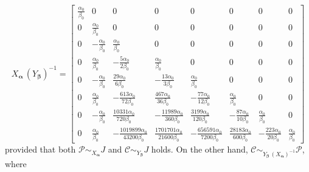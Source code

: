 \begin{displaymath}
{X_{\boldsymbol{\alpha}}\,\left(Y_{\boldsymbol{\beta}}\right)^{-1}} = \left[\begin{matrix}\frac{\alpha_{0}}{\beta_{0}} & 0 & 0 & 0 & 0 & 0 & 0 & 0\\0 & \frac{\alpha_{0}}{\beta_{0}} & 0 & 0 & 0 & 0 & 0 & 0\\0 & - \frac{\alpha_{0}}{\beta_{0}} & \frac{\alpha_{0}}{\beta_{0}} & 0 & 0 & 0 & 0 & 0\\0 & \frac{\alpha_{0}}{\beta_{0}} & - \frac{5 \alpha_{0}}{2 \beta_{0}} & \frac{\alpha_{0}}{\beta_{0}} & 0 & 0 & 0 & 0\\0 & - \frac{\alpha_{0}}{\beta_{0}} & \frac{29 \alpha_{0}}{6 \beta_{0}} & - \frac{13 \alpha_{0}}{3 \beta_{0}} & \frac{\alpha_{0}}{\beta_{0}} & 0 & 0 & 0\\0 & \frac{\alpha_{0}}{\beta_{0}} & - \frac{613 \alpha_{0}}{72 \beta_{0}} & \frac{467 \alpha_{0}}{36 \beta_{0}} & - \frac{77 \alpha_{0}}{12 \beta_{0}} & \frac{\alpha_{0}}{\beta_{0}} & 0 & 0\\0 & - \frac{\alpha_{0}}{\beta_{0}} & \frac{10331 \alpha_{0}}{720 \beta_{0}} & - \frac{11989 \alpha_{0}}{360 \beta_{0}} & \frac{3199 \alpha_{0}}{120 \beta_{0}} & - \frac{87 \alpha_{0}}{10 \beta_{0}} & \frac{\alpha_{0}}{\beta_{0}} & 0\\0 & \frac{\alpha_{0}}{\beta_{0}} & - \frac{1019899 \alpha_{0}}{43200 \beta_{0}} & \frac{1701701 \alpha_{0}}{21600 \beta_{0}} & - \frac{656591 \alpha_{0}}{7200 \beta_{0}} & \frac{28183 \alpha_{0}}{600 \beta_{0}} & - \frac{223 \alpha_{0}}{20 \beta_{0}} & \frac{\alpha_{0}}{\beta_{0}}\end{matrix}\right]
\end{displaymath}
provided that both $\mathcal{P}\sim_{X_{\boldsymbol{\alpha}}}J$ and $\mathcal{C}\sim_{Y_{\boldsymbol{\beta}}}J$ holds. On the other hand,
$\mathcal{C} \sim_{Y_{\boldsymbol{\beta}}\,\left(X_{\boldsymbol{\alpha}}\right)^{-1}}\mathcal{P}$, where
